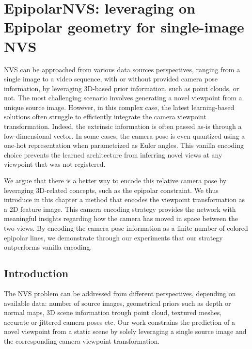 \chapter{EpipolarNVS: leveraging on Epipolar geometry for single-image NVS} 
\label{chapter:epipolarnvs}


\newcommand{\tableindent}{\,\,\,\,}
\newcommand{\vt}{\mathbf{t}}

\newcommand{\std}{$\pm\,$}
\newcommand{\clf}{\textit{clf}} \newcommand{\gray}[1]{{\color{darkgray}#1}}



\ac{NVS} can be approached from various data sources perspectives, ranging from a single image to a video sequence, with or without provided camera pose information, by leveraging 3D-based prior information, such as point clouds, or not. The most challenging scenario involves generating a novel viewpoint from a unique source image. However, in this complex case, the latest learning-based solutions often struggle to efficiently integrate the camera viewpoint transformation. Indeed, the extrinsic information is often passed as-is through a low-dimensional vector. In some cases, the camera pose is even quantized using a one-hot representation when parametrized as Euler angles. This vanilla encoding choice prevents the learned architecture from inferring novel views at any viewpoint that was not registered. 

We argue that there is a better way to encode this relative camera pose by leveraging 3D-related concepts, such as the epipolar constraint. We thus introduce in this chapter a method that encodes the viewpoint transformation as a 2D feature image. This camera encoding strategy provides the network with meaningful insights regarding how the camera has moved in space between the two views. By encoding the camera pose information as a finite number of colored epipolar lines, we demonstrate through our experiments that our strategy outperforms vanilla encoding. 

\section{Introduction}

The \ac{NVS} problem can be addressed from different perspectives, depending on available data: number of source images, geometrical priors such as depth or normal maps, 3D scene information trough point cloud, textured meshes, accurate or jittered camera poses etc. Our work constrains the prediction of a novel viewpoint from a static scene by solely leveraging a single source image and the corresponding camera viewpoint transformation. 

